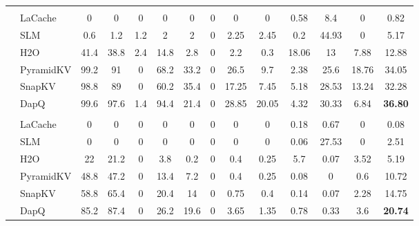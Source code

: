 \begin{table}[t]
{\begin{tabular}{>{\bfseries}c >{\raggedright}p{2.2cm} *{12}{c}}
& \multicolumn{13}{c}{\cellcolor{gray!20}\textbf{KV Cache Size = 128}} \\
& LaCache & 0 & 0 & 0 & 0 & 0 & 0 & 0 & 0 & 0.58 & 8.4 & 0 & 0.82 \\
& SLM & 0.6 & 1.2 & 1.2 & 2 & 2 & 0 & 2.25 & 2.45 & 0.2 & 44.93 & 0 & 5.17 \\
& H2O & 41.4 & 38.8 & 2.4 & 14.8 & 2.8 & 0 & 2.2 & 0.3 & 18.06 & 13 & 7.88 & 12.88 \\
& PyramidKV & 99.2 & 91 & 0 & 68.2 & 33.2 & 0 & 26.5 & 9.7 & 2.38 & 25.6 & 18.76 & 34.05 \\
& SnapKV & 98.8 & 89 & 0 & 60.2 & 35.4 & 0 & 17.25 & 7.45 & 5.18 & 28.53 & 13.24 & 32.28 \\
& DapQ & 99.6 & 97.6 & 1.4 & 94.4 & 21.4 & 0 & 28.85 & 20.05 & 4.32 & 30.33 & 6.84 & \textbf{36.80} \\
& \multicolumn{13}{c}{\cellcolor{gray!20}\textbf{KV Cache Size = 64}} \\
& LaCache & 0 & 0 & 0 & 0 & 0 & 0 & 0 & 0 & 0.18 & 0.67 & 0 & 0.08 \\
& SLM & 0 & 0 & 0 & 0 & 0 & 0 & 0 & 0 & 0.06 & 27.53 & 0 & 2.51 \\
& H2O & 22 & 21.2 & 0 & 3.8 & 0.2 & 0 & 0.4 & 0.25 & 5.7 & 0.07 & 3.52 & 5.19 \\
& PyramidKV & 48.8 & 47.2 & 0 & 13.4 & 7.2 & 0 & 0.4 & 0.25 & 0.08 & 0 & 0.6 & 10.72 \\
& SnapKV & 58.8 & 65.4 & 0 & 20.4 & 14 & 0 & 0.75 & 0.4 & 0.14 & 0.07 & 2.28 & 14.75 \\
& DapQ & 85.2 & 87.4 & 0 & 26.2 & 19.6 & 0 & 3.65 & 1.35 & 0.78 & 0.33 & 3.6 & \textbf{20.74} \\
\bottomrule
\end{tabular}
}
\label{table:ruler_llama3}
\end{table}

\clearpage

